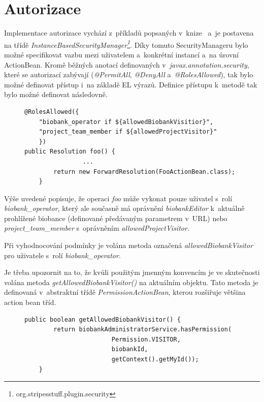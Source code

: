\documentclass[11pt,draft,oneside]{fithesis2}
\begin{document}
\section{Autorizace}
Implementace autorizace vychází z~příkladů popsaných v~knize~\cite{Stripes} a~je postavena na třídě \textit{InstanceBasedSecurityManager\footnote{org.stripesstuff.plugin.security}}. Díky tomuto SecurityManageru bylo možné specifikovat vazbu mezi uživatelem a~konkrétní instancí a~na úrovní ActionBean. Kromě běžných anotací definovaných v~\textit{javax.annotation.security}, které se autorizací zabývají (\textit{@PermitAll}, \textit{@DenyAll} a~\textit{@RolesAllowed}), tak bylo možné definovat přístup i~na základě EL výrazů. Definice přístupu k~metodě tak bylo možné definovat následovně.

\begin{figure}[h!]
\begin{center}
\begin{lstlisting}[mathescape=false]
@RolesAllowed({
	"biobank_operator if ${allowedBiobankVisitior}", 
	"project_team_member if ${allowedProjectVisitor}"
	})
public Resolution foo() { 
				...
        return new ForwardResolution(FooActionBean.class);
    }
\end{lstlisting}
\end{center}
\end{figure}

Výše uvedené popisuje, že operaci \textit{foo} může vykonat pouze uživatel s~rolí \textit{biobank\_operator}, který ale současně má oprávnění \textit{biobankEditor} k~aktuálně prohlížené biobance (definované předávaným parametrem v~URL) nebo \textit{project\_team\_member} s~oprávněním \textit{allowedProjectVisitor}.

Při vyhodnocování podmínky je volána metoda označená \textit{allowedBiobankVisitor} pro uživatele s~rolí \textit{biobank\_operator}. 

Je třeba upozornit na to, že kvůli použitým jmenným konvencím je ve skutečnosti volána metoda \textit{getAllowedBiobankVisitor()} na aktuálním objektu. Tato metoda je definovaná v~abstraktní třídě \textit{PermissionActionBean}, kterou rozšiřuje většina action bean tříd.

\begin{figure}[h!]
\begin{center}
\begin{lstlisting}[mathescape=false]
public boolean getAllowedBiobankVisitor() {
        return biobankAdministratorService.hasPermission(
						Permission.VISITOR, 
						biobankId, 
						getContext().getMyId());
    }
\end{lstlisting}
\end{center}
\end{figure}
\end{document}
